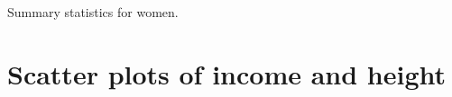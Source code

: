 \documentclass{article}
\begin{document}
\begin{table}[h]
\label{tab:summary_women}
\caption{Summary statistics for women.}

\end{table}

\clearpage

\section{Scatter plots of income and height}


\clearpage




\iffalse



\fi

\begin{appendix}
	\listoffigures
	\listoftables	
\end{appendix}
\end{document}
